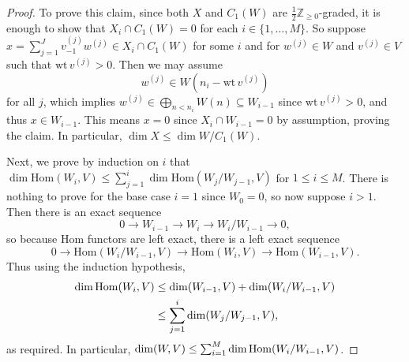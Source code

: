 \documentclass[11pt, reqno]{amsart}
\theoremstyle{definition}\newtheorem{defi}[thm]{Definition}
\theoremstyle{definition}\newtheorem{rem}[thm]{Remark}
\theoremstyle{definition}\newtheorem{exam}[thm]{Example}
\theoremstyle{definition}\newtheorem{assum}[thm]{Assumption}
\newcommand{\ZZ}{\mathbb{Z}}
\let\hom\relax
\DeclareMathOperator{\hom}{Hom}
\begin{document}
\begin{proof}
To prove this claim, since both $X$ and $C_1(W)$ are $\frac{1}{2}\ZZ_{\geq 0}$-graded, it is enough to show that $X_i\cap C_1(W)=0$ for each $i\in\lbrace 1,\ldots, M\rbrace$. So suppose $x=\sum_{j=1}^J v^{(j)}_{-1} w^{(j)}\in X_i\cap C_1(W)$ for some $i$ and for $w^{(j)}\in W$ and $v^{(j)}\in V$ such that $\mathrm{wt}\,v^{(j)}>0$. Then we may assume
\begin{equation*}
w^{(j)}\in W(n_i-\mathrm{wt}\,v^{(j)})
\end{equation*}
for all $j$, which implies $w^{(j)}\in\bigoplus_{n<n_i} W(n)\subseteq W_{i-1}$ since $\mathrm{wt}\,v^{(j)}>0$, and thus $x\in W_{i-1}$. This means $x=0$ since $X_i\cap W_{i-1}=0$ by assumption, proving the claim. In particular, $\dim X\leq\dim W/C_1(W)$.

Next, we prove by induction on $i$ that $\dim\mathrm{Hom}(W_i,V)\leq\sum_{j=1}^i \dim\mathrm{Hom}(W_j/W_{j-1}, V)$ for $1\leq i\leq M$. There is nothing to prove for the base case $i=1$ since $W_0=0$, so now suppose $i>1$. Then there is an exact sequence
\begin{equation*}
0\longrightarrow W_{i-1}\longrightarrow W_i\longrightarrow W_i/W_{i-1}\longrightarrow 0,
\end{equation*}
so because Hom functors are left exact, there is a left exact sequence
\begin{equation*}
0\longrightarrow\mathrm{Hom}(W_i/W_{i-1}, V)\longrightarrow\mathrm{Hom}(W_i,V)\longrightarrow\mathrm{Hom}(W_{i-1},V).
\end{equation*}
Thus using the induction hypothesis,
\begin{align*}
\dim\mathrm{Hom}(W_i,V) & \leq \dim\hom(W_{i-1},V)+\dim\hom(W_i/W_{i-1},V)\\
&\leq\sum_{j=1}^i\dim\hom(W_j/W_{j-1},V),
\end{align*}
as required. In particular, $\dim\hom(W,V)\leq\sum_{i=1}^M \dim\mathrm{Hom}(W_i/W_{i-1},V)$.


\end{proof}
\end{document}
